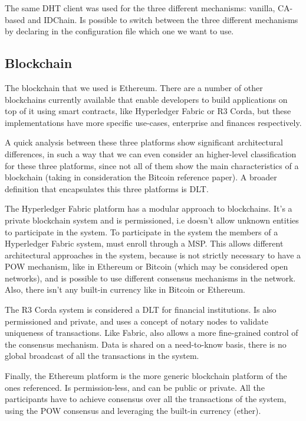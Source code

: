 The same DHT client was used for the three different mechanisms: vanilla, CA-based and IDChain.
Is possible to switch between the three different mechanisms by declaring in the configuration file which one we want to use.

\subsection{Blockchain}

The blockchain that we used is Ethereum.
There are a number of other blockchains currently available that enable developers to build applications on top of it using smart contracts, like Hyperledger Fabric\cite{cachin2016architecture} or R3 Corda\cite{mikehearn2016}, but these implementations have more specific use-cases, enterprise and finances respectively.

A quick analysis between these three platforms show significant architectural differences, in such a way that we can even consider an higher-level classification for these three platforms, since not all of them show the main characteristics of a blockchain (taking in consideration the Bitcoin reference paper).
A broader definition that encapsulates this three platforms is \ac{DLT}.

The Hyperledger Fabric platform has a modular approach to blockchains. It's a private blockchain system  and is permissioned, i.e doesn't allow unknown entities to participate in the system.
To participate in the system the members of a Hyperledger Fabric system, must enroll through a \ac{MSP}.
This allows different architectural approaches in the system, because is not strictly necessary to have a \ac{POW} mechanism, like in Ethereum or Bitcoin (which may be considered open networks), and is possible to use different consensus mechanisms in the network.
Also, there isn't any built-in currency like in Bitcoin or Ethereum.

The R3 Corda system is considered a \ac{DLT} for financial institutions.
Is also permissioned and private, and uses a concept of notary nodes to validate uniqueness of transactions. Like Fabric, also allows a more fine-grained control of the consensus mechanism.
Data is shared on a need-to-know basis, there is no global broadcast of all the transactions in the system.

Finally, the Ethereum platform is the more generic blockchain platform of the ones referenced.
Is permission-less, and can be public or private.
All the participants have to achieve consensus over all the transactions of the system, using the \ac{POW} consensus and leveraging the built-in currency (ether).

